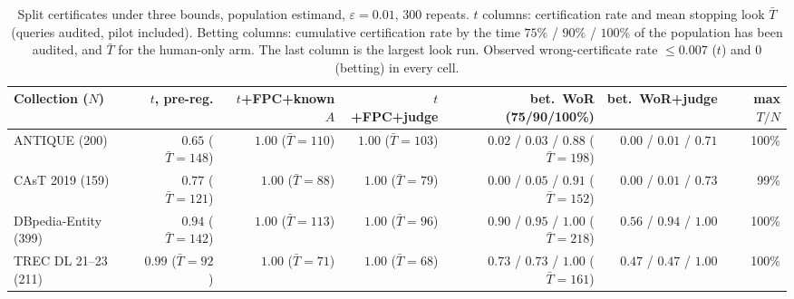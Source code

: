 \documentclass{article}
\newcommand{\eps}{\varepsilon}
\begin{document}
\begin{table}[htbp]\centering\scriptsize\setlength{\tabcolsep}{2pt}
\caption{Split certificates under three bounds, population estimand, $\eps=0.01$, 300 repeats. $t$ columns: certification rate and mean stopping look $\bar T$ (queries audited, pilot included). Betting columns: cumulative certification rate by the time $75\%$ / $90\%$ / $100\%$ of the population has been audited, and $\bar T$ for the human-only arm. The last column is the largest look run. Observed wrong-certificate rate $\le0.007$ ($t$) and $0$ (betting) in every cell.}\label{tab:exact}
\begin{tabular}{lrrrrrr}\toprule
Collection ($N$) & $t$, pre-reg. & $t$+FPC+known $A$ & $t$+FPC+judge & bet.\ WoR (75/90/100\%) & bet.\ WoR+judge & max $T/N$\\\midrule
ANTIQUE (200) & $0.65$ ($\bar T{=}148$) & $1.00$ ($\bar T{=}110$) & $1.00$ ($\bar T{=}103$) & $0.02$ / $0.03$ / $0.88$ ($\bar T{=}198$) & $0.00$ / $0.01$ / $0.71$ & 100\%\\
CAsT 2019 (159) & $0.77$ ($\bar T{=}121$) & $1.00$ ($\bar T{=}88$) & $1.00$ ($\bar T{=}79$) & $0.00$ / $0.05$ / $0.91$ ($\bar T{=}152$) & $0.00$ / $0.01$ / $0.73$ & 99\%\\
DBpedia-Entity (399) & $0.94$ ($\bar T{=}142$) & $1.00$ ($\bar T{=}113$) & $1.00$ ($\bar T{=}96$) & $0.90$ / $0.95$ / $1.00$ ($\bar T{=}218$) & $0.56$ / $0.94$ / $1.00$ & 100\%\\
TREC DL 21--23 (211) & $0.99$ ($\bar T{=}92$) & $1.00$ ($\bar T{=}71$) & $1.00$ ($\bar T{=}68$) & $0.73$ / $0.73$ / $1.00$ ($\bar T{=}161$) & $0.47$ / $0.47$ / $1.00$ & 100\%\\\bottomrule
\end{tabular}
\end{table}
\end{document}
